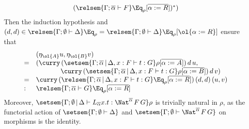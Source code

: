 \documentclass{lmcs}
\theoremstyle{plain}\newtheorem{satz}[thm]{Satz}
\begin{document}
\begin{itemize}
\[\begin{array}{lll}
(\relsem{\Gamma;\overline{\alpha} \vdash F}
\Eq_{\rho}[\overline{\alpha := R}])^*)
\end{array}\]
Then the induction hypothesis and 
$(d,d) \in \relsem{\Gamma; \emptyset \vdash \Delta} \Eq_\rho =
\relsem{\Gamma; \emptyset \vdash \Delta} \Eq_\rho[\ol{\alpha := R}]$
ensure that
\[\begin{array}{ll}
& (\eta_{\ol{A}}u,\eta_{\ol{B}}v)\\
= & (\curry\, (\setsem{\Gamma; \overline{\alpha} \,|\, \Delta, x : F
  \vdash t: G}\rho[\overline{\alpha := A}])\,d\,u, \\
  &\hspace{0.5in} \curry\,
(\setsem{\Gamma; \overline{\alpha} \,|\, \Delta, x : F \vdash t:
  G}\rho[\overline{\alpha := B}])\,d\,v)\\
= & \curry\, (\relsem{\Gamma; \overline{\alpha} \,|\, \Delta, x : F
  \vdash t: G}\Eq_\rho[\overline{\alpha := R}])\,(d,d)\,(u,v)\\
: & \relsem{\Gamma; \overline{\alpha} \vdash G}
\Eq_{\rho}[\overline{\alpha := R}]  
\end{array}\]
Moreover,
$\setsem{\Gamma; \emptyset \,|\, \Delta \vdash L_{\overline{\alpha}} x.t
: \Nat^{\overline{\alpha}} \,F \,G} \rho$
is trivially natural in $\rho$,
as the functorial action of
$\setsem{\Gamma; \emptyset \vdash \Delta}$
and $\setsem{\Gamma; \emptyset \vdash \Nat^{\overline{\alpha}} \,F \,G}$
on morphisms is the identity.


\end{itemize}
\end{document}
